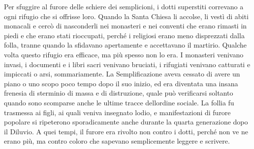 Per sfuggire al furore delle schiere dei semplicioni, i dotti superstiti
correvano a ogni rifugio che si offrisse loro. Quando la Santa Chiesa li
accolse, li vestì di abiti monacali e cercò di nasconderli nei monasteri
e nei conventi che erano rimasti in piedi e che erano stati rioccupati,
perché i religiosi erano meno disprezzati dalla folla, tranne quando la
sfidavano apertamente e accettavano il martirio. Qualche volta questo
rifugio era efficace, ma più spesso non lo era. I monasteri venivano
invasi, i documenti e i libri sacri venivano bruciati, i rifugiati
venivano catturati e impiccati o arsi, sommariamente. La Semplificazione
aveva cessato di avere un piano o uno scopo poco tempo dopo il suo
inizio, ed era diventata una insana frenesia di sterminio di massa e di
distruzione, quale può verificarsi soltanto quando sono scomparse anche
le ultime tracce dell\textquotesingle ordine sociale. La follia fu
trasmessa ai figli, ai quali veniva insegnato l\textquotesingle odio, e
manifestazioni di furore popolare si ripeterono sporadicamente anche
durante la quarta generazione dopo il Diluvio. A quei tempi, il furore
era rivolto non contro i dotti, perché non ve ne erano più, ma contro
coloro che sapevano semplicemente leggere e scrivere.

